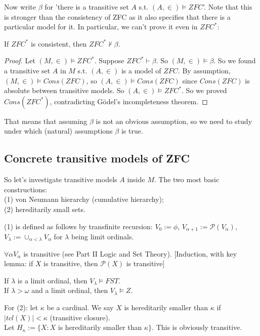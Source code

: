 \documentclass[a4paper]{article}
\begin{document}
Now write $\beta$ for 'there is a transitive set $A$ s.t. $(A,\in) \vDash ZFC$'. Note that this is stronger than the consistency of ZFC as it also specifies that there is a particular model for it. In particular, we can't prove it even in $ZFC^*$:

\begin{thm}
If $ZFC^*$ is consistent, then $ZFC^* \not\vdash \beta$.
\begin{proof}
Let $(M,\in) \vDash ZFC^*$. Suppose $ZFC^* \vdash \beta$. So $(M,\in) \vDash \beta$. So we found a transitive set $A$ in $M$ s.t. $(A,\in)$ is a model of $ZFC$. By assumption, $(M,\in) \vDash Cons(ZFC)$, so $(A,\in) \vDash Cons(ZFC)$ since $Cons(ZFC)$ is absolute between transitive models. So $(A,\in) \vDash ZFC^*$. So we proved $Cons(ZFC^*)$, contradicting G\"{o}del's incompleteness theorem.
\end{proof}
\end{thm}

That means that assuming $\beta$ is not an obvious assumption, so we need to study under which (natural) assumptions $\beta$ is true.

\subsection{Concrete transitive models of ZFC}

So let's investigate transitive models $A$ inside $M$. The two most basic constructions: \\
(1) von Neumann hierarchy (cumulative hierarchy);\\
(2) hereditarily small sets.

(1) is defined as follows by transfinite recursion: $V_0:=\phi$, $V_{\alpha+1} := \mathcal{P}(V_\alpha)$, $V_\lambda := \cup_{\alpha<\lambda} V_\alpha$ for $\lambda$ being limit ordinals.

\begin{prop}
$\forall \alpha V_\alpha$ is transitive (see Part II Logic and Set Theory). [Induction, with key lemma: if $X$ is transitive, then $\mathcal{P}(X)$ is transitive]
\end{prop}

If $\lambda$ is a limit ordinal, then $V_\lambda \vDash FST$.\\
If $\lambda > \omega$ and a limit ordinal, then $V_\lambda \vDash Z$.

For (2): let $\kappa$ be a cardinal. We say $X$ is hereditarily smaller than $\kappa$ if $|tcl(X)| < \kappa$ (transitive closure).\\
Let $H_\kappa := \{X:X$ is hereditarily smaller than $\kappa\}$. This is obviously transitive.
\end{document}
